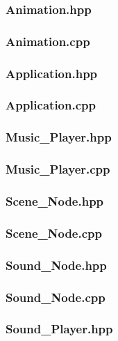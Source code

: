 \subsubsection{Animation.hpp}

\subsubsection{Animation.cpp}

\subsubsection{Application.hpp}

\subsubsection{Application.cpp}

\subsubsection{Music\_Player.hpp}

\subsubsection{Music\_Player.cpp}

\subsubsection{Scene\_Node.hpp}

\subsubsection{Scene\_Node.cpp}

\subsubsection{Sound\_Node.hpp}

\subsubsection{Sound\_Node.cpp}

\subsubsection{Sound\_Player.hpp}

